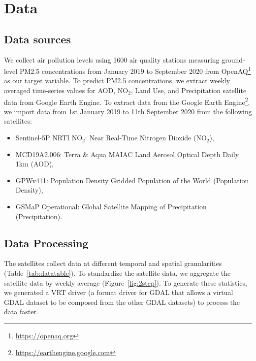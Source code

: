 \section{Data}\label{sec:data}

\subsection{Data sources}
We collect air pollution levels using 1600 air quality stations measuring ground-level PM2.5 concentrations from January 2019 to September 2020 from OpenAQ\footnote{\url{https://openaq.org}} as our target variable. To predict PM2.5 concentrations, we extract weekly averaged time-series values for AOD, NO$_2$, Land Use, and Precipitation satellite data from Google Earth Engine. To extract data from the Google Earth Engine\footnote{\url{https://earthengine.google.com}}, we import data from 1st January 2019 to 11th September 2020 from the following satellites:
%
\begin{itemize}
    \item Sentinel-5P NRTI NO$_2$: Near Real-Time Nitrogen Dioxide (NO$_2$),
    \item MCD19A2.006: Terra \& Aqua MAIAC Land Aerosol Optical Depth Daily 1km (AOD),
    \item GPWv411: Population Density Gridded Population of the World (Population Density),
    \item GSMaP Operational: Global Satellite Mapping of Precipitation (Precipitation).
\end{itemize}

\subsection{Data Processing}
The satellites collect data at different temporal and spatial granularities (Table~\ref{tab:datatable}). To standardize the satellite data, we aggregate the satellite data by weekly average (Figure~\ref{fig:2step}). To generate these statistics, we generated a VRT driver (a format driver for GDAL that allows a virtual GDAL dataset to be composed from the other GDAL datasets) to process the data faster.

